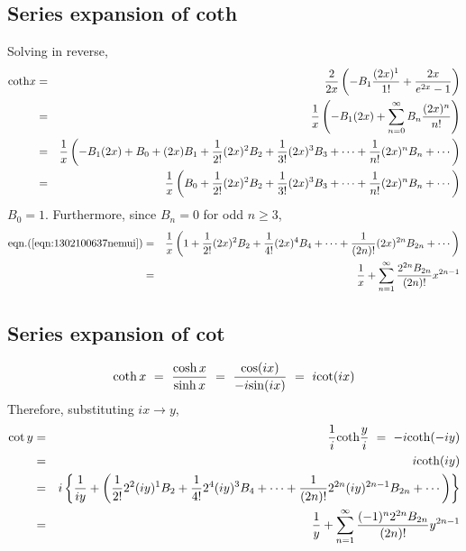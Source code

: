 \documentclass[uplatex,a4j,12pt,dvipdfmx]{jsarticle}
\begin{document}
\subsection{Series expansion of coth}

Solving in reverse,
\begin{eqnarray}
	{\rm coth}x
	&=&
	\dfrac{2}{2x}
	\left(
	-
	B_{1}
	\dfrac{(2x)^{1}}{1!}
	+
	\dfrac{2x}{e^{2x}-1}
	\right)
	\nonumber \\ &=&
	\dfrac{1}{x}
	\left(
	-B_{1}(2x)
	+
	\sum_{n=0}^{\infty}
	B_{n}
	\dfrac{(2x)^{n}}{n!}
	\right)
	\nonumber \\ &=&
	\dfrac{1}{x}
	\left(
	-B_{1}(2x)
	+
	B_{0}
	+
	(2x)
	B_{1}
	+
	\dfrac{1}{2!}
	(2x)^{2}
	B_{2}
	+
	\dfrac{1}{3!}
	(2x)^{3}
	B_{3}
	+
	\cdots
	+
	\dfrac{1}{n!}
	(2x)^{n}
	B_{n}
	+
	\cdots
	\right)
	\nonumber \\ &=&
	\dfrac{1}{x}
	\left(
	B_{0}
	+
	\dfrac{1}{2!}
	(2x)^{2}
	B_{2}
	+
	\dfrac{1}{3!}
	(2x)^{3}
	B_{3}
	+
	\cdots
	+
	\dfrac{1}{n!}
	(2x)^{n}
	B_{n}
	+
	\cdots
	\right)
	\label{eqn:1302100637nemui}
\end{eqnarray}
$B_{0}=1$. Furthermore, since $B_{n}=0$ for odd $n \geq 3$,
\begin{eqnarray}
	{\rm eqn.}(\ref{eqn:1302100637nemui})
	&=&
	\dfrac{1}{x}
	\left(
	1
	+
	\dfrac{1}{2!}
	(2x)^{2}
	B_{2}
	+
	\dfrac{1}{4!}
	(2x)^{4}
	B_{4}
	+
	\cdots
	+
	\dfrac{1}{(2n)!}
	(2x)^{2n}
	B_{2n}
	+
	\cdots
	\right)
	\nonumber \\ &=&
	\dfrac{1}{x}
	+
	\sum_{n=1}^{\infty}
	\dfrac{
		2^{2n}
		B_{2n}
	}{(2n)!}
	x^{2n-1}
\end{eqnarray}




\subsection{Series expansion of cot}
\begin{eqnarray}
	{\rm coth} \ \! x
	\ = \
	\dfrac{{\rm cosh} \ \! x}{{\rm sinh} \ \! x}
	\ = \
	\dfrac{{\rm cos}(ix)}{-i{\rm sin}(ix)}
	\ = \
	i {\rm cot} (ix)
\end{eqnarray}
Therefore, substituting $ix \to y$,
\begin{eqnarray}
	{\rm cot} \ \! y
	&=&
	\dfrac{1}{i} {\rm coth} \dfrac{y}{i}
	\ = \
	-i {\rm coth} (-iy)
	\nonumber \\ &=&
	i {\rm coth} (iy)
	\nonumber \\ &=&
	i
	\left\{
	\dfrac{1}{iy}
	+
	\left(
	\dfrac{1}{2!}
	2^{2} (iy)^{1}
	B_{2}
	+
	\dfrac{1}{4!}
	2^{4} (iy)^{3}
	B_{4}
	+
	\cdots
	+
	\dfrac{1}{(2n)!}
	2^{2n} (iy)^{2n-1}
	B_{2n}
	+
	\cdots
	\right)
	\right\}
	\nonumber \\ &=&
	\dfrac{1}{y}
	+
	\sum_{n=1}^{\infty}
	\dfrac{(-1)^{n} 2^{2n} B_{2n} }{(2n)!}
	y^{2n-1}
\end{eqnarray}
\end{document}
